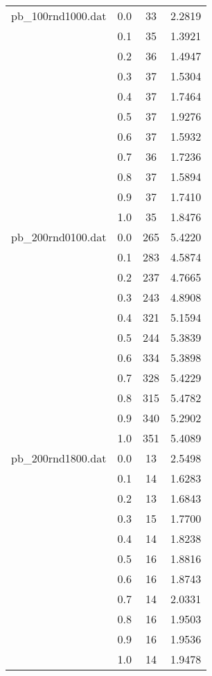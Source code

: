 \documentclass[12pt]{article}
\begin{document}
\begin{longtable}{|c|c|c|c|}
      \hline
      
      pb_100rnd1000.dat & 0.0 & 33 & 2.2819 \\
      & 0.1 & 35 & 1.3921 \\
      & 0.2 & 36 & 1.4947 \\
      & 0.3 & 37 & 1.5304 \\
      & 0.4 & 37 & 1.7464 \\
      & 0.5 & 37 & 1.9276 \\
      & 0.6 & 37 & 1.5932 \\
      & 0.7 & 36 & 1.7236 \\
      & 0.8 & 37 & 1.5894 \\
      & 0.9 & 37 & 1.7410 \\
      & 1.0 & 35 & 1.8476 \\
      
      \hline
      
      pb_200rnd0100.dat & 0.0 & 265 & 5.4220 \\
      & 0.1 & 283 & 4.5874 \\
      & 0.2 & 237 & 4.7665 \\
      & 0.3 & 243 & 4.8908 \\
      & 0.4 & 321 & 5.1594 \\
      & 0.5 & 244 & 5.3839 \\
      & 0.6 & 334 & 5.3898 \\
      & 0.7 & 328 & 5.4229 \\
      & 0.8 & 315 & 5.4782 \\
      & 0.9 & 340 & 5.2902 \\
      & 1.0 & 351 & 5.4089 \\
      
      \hline
      
      pb_200rnd1800.dat & 0.0 & 13 & 2.5498 \\
      & 0.1 & 14 & 1.6283 \\
      & 0.2 & 13 & 1.6843 \\
      & 0.3 & 15 & 1.7700 \\
      & 0.4 & 14 & 1.8238 \\
      & 0.5 & 16 & 1.8816 \\
      & 0.6 & 16 & 1.8743 \\
      & 0.7 & 14 & 2.0331 \\
      & 0.8 & 16 & 1.9503 \\
      & 0.9 & 16 & 1.9536 \\
      & 1.0 & 14 & 1.9478 \\
      

\end{longtable}
\end{document}
